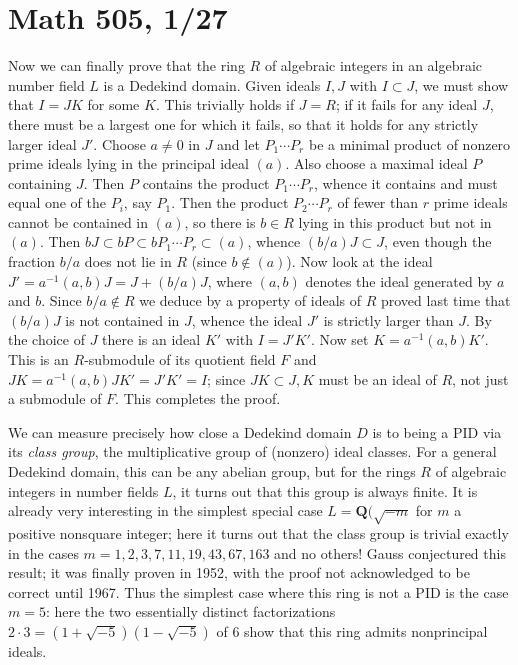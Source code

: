 \documentclass[10pt]{article}
\begin{document}
\section*{Math 505, 1/27}

Now we can finally prove that the ring $R$ of algebraic integers in an
algebraic number field $L$ is a Dedekind domain. Given ideals $I,J$ with
$I\subset J$, we must show that $I=JK$ for some $K$. This trivially
holds if $J=R$; if it fails for any ideal $J$, there must be a largest
one for which it fails, so that it holds for any strictly larger ideal
$J'$. Choose $a\ne0$ in $J$ and let $P_1\cdots P_r$ be a minimal product
of nonzero prime ideals lying in the principal ideal $(a)$. Also choose
a maximal ideal $P$ containing $J$. Then $P$ contains the product
$P_1\cdots P_r$, whence it contains and must equal one of the $P_i$, say
$P_1$. Then the product $P_2\cdots P_r$ of fewer than $r$ prime ideals
cannot be contained in $(a)$, so there is $b\in R$ lying in this product
but not in $(a)$. Then $bJ\subset bP\subset bP_1\cdots P_r\subset (a)$,
whence $(b/a)J\subset J$, even though the fraction $b/a$ does not lie in
$R$ (since $b\notin (a)$). Now look at the ideal $J' = a^{-1}(a,b)J = J
+ (b/a)J$, where $(a,b)$ denotes the ideal generated by $a$ and $b$.
Since $b/a\notin R$ we deduce by a property of ideals of $R$ proved last
time that $(b/a)J$ is not contained in $J$, whence the ideal $J'$ is
strictly larger than $J$. By the choice of $J$ there is an ideal $K'$
with $I=J'K'$. Now set $K= a^{-1}(a,b)K'$. This is an $R$-submodule of
its quotient field $F$ and $JK = a^{-1}(a,b)JK' = J'K' = I$; since
$JK\subset J, K$ must be an ideal of $R$, not just a submodule of $F$.
This completes the proof.

We can measure precisely how close a Dedekind domain $D$ is to being a
PID via its {\sl class group}, the multiplicative group of (nonzero)
ideal classes. For a general Dedekind domain, this can be any abelian
group, but for the rings $R$ of algebraic integers in number fields $L$,
it turns out that this group is always finite. It is already very
interesting in the simplest special case $L=\mathbf Q(\sqrt{-m}$ for $m$
a positive nonsquare integer; here it turns out that the class group is
trivial exactly in the cases $m = 1,2,3,7,11,19,43,67,163$ and no
others! Gauss conjectured this result; it was finally proven in 1952,
with the proof not acknowledged to be correct until 1967. Thus the
simplest case where this ring is not a PID is the case $m=5$: here the
two essentially distinct factorizations $2\cdot 3 =
(1+\sqrt{-5})(1-\sqrt{-5})$ of 6 show that this ring admits nonprincipal
ideals.
\end{document}
